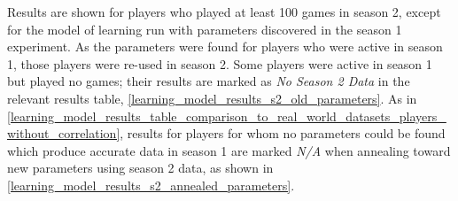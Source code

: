 Results are shown for players who played at least 100 games in season 2, except
for the model of learning run with parameters discovered in the season 1
experiment. As the parameters were found for players who were active in season
1, those players were re-used in season 2. Some players were active in season 1
but played no games; their results are marked as \emph{No Season 2 Data} in the relevant
results table, \cref{learning_model_results_s2_old_parameters}. As in
\cref{learning_model_results_table_comparison_to_real_world_datasets_players_without_correlation},
results for players for whom no parameters could be found which produce accurate data in
season 1 are marked \emph{N/A} when annealing toward new parameters using season
2 data, as shown in \cref{learning_model_results_s2_annealed_parameters}.


\newcommand{\noparams}{\multicolumn{7}{c}{\emph{N/A}} \tabularnewline}
\newcommand{\noseasontwo}{\multicolumn{7}{c}{\emph{No Season 2 Data}} \tabularnewline}
